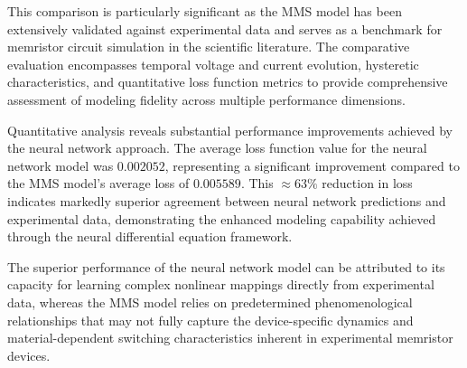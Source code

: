 \documentclass[11pt, oneside]{article}
\begin{document}
This comparison is particularly significant as the MMS model has been extensively validated against experimental data and serves as a benchmark for memristor circuit simulation in the scientific literature. The comparative evaluation encompasses temporal voltage and current evolution, hysteretic characteristics, and quantitative loss function metrics to provide comprehensive assessment of modeling fidelity across multiple performance dimensions.

Quantitative analysis reveals substantial performance improvements achieved by the neural network approach. The average loss function value for the neural network model was $0.002052$, representing a significant improvement compared to the MMS model's average loss of $0.005589$. This $\approx 63\%$ reduction in loss indicates markedly superior agreement between neural network predictions and experimental data, demonstrating the enhanced modeling capability achieved through the neural differential equation framework.

The superior performance of the neural network model can be attributed to its capacity for learning complex nonlinear mappings directly from experimental data, whereas the MMS model relies on predetermined phenomenological relationships that may not fully capture the device-specific dynamics and material-dependent switching characteristics inherent in experimental memristor devices.
\end{document}
